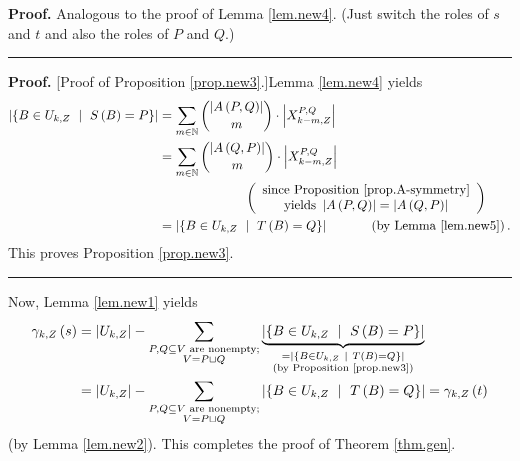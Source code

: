 \documentclass[numbers=enddot,12pt,final,onecolumn,notitlepage]{scrartcl}%
\theoremstyle{definition}
\newenvironment{proof}[1][Proof]{\noindent\textbf{#1.} }{\ \rule{0.5em}{0.5em}}
\let\sumnonlimits\sum
\renewcommand{\sum}{\sumnonlimits\limits}
\theoremstyle{plainsl}
\begin{document}
\begin{proof}
Analogous to the proof of Lemma \ref{lem.new4}. (Just switch the roles of $s$
and $t$ and also the roles of $P$ and $Q$.)
\end{proof}

\begin{proof}
[Proof of Proposition \ref{prop.new3}.]Lemma \ref{lem.new4} yields%
\begin{align*}
\left\vert \left\{  B\in U_{k,Z}\ \mid\ S\left(  B\right)  =P\right\}
\right\vert  &  =\sum_{m\in\mathbb{N}}\dbinom{\left\vert A\left(  P,Q\right)
\right\vert }{m}\cdot\left\vert X_{k-m,Z}^{P,Q}\right\vert \\
&  =\sum_{m\in\mathbb{N}}\dbinom{\left\vert A\left(  Q,P\right)  \right\vert
}{m}\cdot\left\vert X_{k-m,Z}^{P,Q}\right\vert \\
&  \ \ \ \ \ \ \ \ \ \ \ \ \ \ \ \ \ \ \ \ \left(
\begin{array}
[c]{c}%
\text{since Proposition \ref{prop.A-symmetry}}\\
\text{yields }\left\vert A\left(  P,Q\right)  \right\vert =\left\vert A\left(
Q,P\right)  \right\vert
\end{array}
\right) \\
&  =\left\vert \left\{  B\in U_{k,Z}\ \mid\ T\left(  B\right)  =Q\right\}
\right\vert \ \ \ \ \ \ \ \ \ \ \left(  \text{by Lemma \ref{lem.new5}}\right)
.
\end{align*}
This proves Proposition \ref{prop.new3}.
\end{proof}

Now, Lemma \ref{lem.new1} yields%
\begin{align*}
\gamma_{k,Z}\left(  s\right)   &  =\left\vert U_{k,Z}\right\vert
-\sum_{\substack{P,Q\subseteq V\text{ are nonempty;}\\V=P\sqcup Q}%
}\underbrace{\left\vert \left\{  B\in U_{k,Z}\ \mid\ S\left(  B\right)
=P\right\}  \right\vert }_{\substack{=\left\vert \left\{  B\in U_{k,Z}%
\ \mid\ T\left(  B\right)  =Q\right\}  \right\vert \\\text{(by Proposition
\ref{prop.new3})}}}\\
&  =\left\vert U_{k,Z}\right\vert -\sum_{\substack{P,Q\subseteq V\text{ are
nonempty;}\\V=P\sqcup Q}}\left\vert \left\{  B\in U_{k,Z}\ \mid\ T\left(
B\right)  =Q\right\}  \right\vert =\gamma_{k,Z}\left(  t\right)
\end{align*}
(by Lemma \ref{lem.new2}). This completes the proof of Theorem \ref{thm.gen}.
\end{document}
